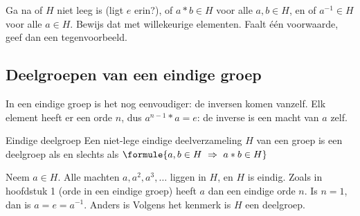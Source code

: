 

\begin{werkwijze}
Ga na of $H$ niet leeg is (ligt $e$ erin?), of $a \ast b \in H$ voor alle $a, b \in H$, en of $a^{-1} \in H$ voor alle $a \in H$. Bewijs dat met willekeurige elementen. Faalt één voorwaarde, geef dan een tegenvoorbeeld.
\end{werkwijze}

\begin{oefeningen}
\end{oefeningen}

\subsection{Deelgroepen van een eindige groep}

In een eindige groep is het nog eenvoudiger: de inversen komen vanzelf. Elk element heeft er een orde $n$, dus $a^{n - 1} \ast a = e$: de inverse is een macht van $a$ zelf.

\begin{theorie}
\begin{stelling}{Eindige deelgroep}
Een niet-lege eindige deelverzameling $H$ van een groep is een deelgroep als en slechts als \quad $\formule{a, b \in H \ \Rightarrow \ a \ast b \in H}$
\end{stelling}

\begin{bewijs}
Neem $a \in H$. Alle machten $a, a^2, a^3, \ldots$ liggen in $H$, en $H$ is eindig. Zoals in hoofdstuk 1 (orde in een eindige groep) heeft $a$ dan een eindige orde $n$. Is $n = 1$, dan is $a = e = a^{-1}$. Anders is
Volgens het kenmerk is $H$ een deelgroep.
\end{bewijs}
\end{theorie}

